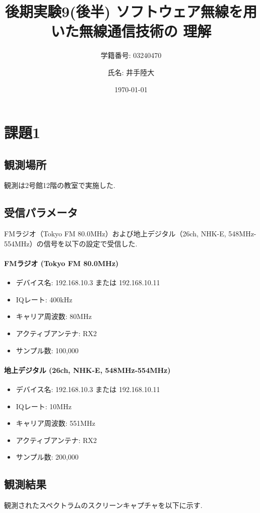 \documentclass[a4paper, twocolumn]{article} %
\title{後期実験9(後半) ソフトウェア無線を用いた無線通信技術の
理解}
\author{学籍番号: 03240470 \and 氏名: 井手陸大}
\date{\today}
\begin{document}
\maketitle

\section{課題1}
\subsection{観測場所}
観測は2号館12階の教室で実施した.

\subsection{受信パラメータ}
FMラジオ（Tokyo FM 80.0MHz）および地上デジタル（26ch, NHK-E, 548MHz-554MHz）の信号を以下の設定で受信した.

\paragraph{FMラジオ (Tokyo FM 80.0MHz)}
\begin{itemize}
    \item デバイス名: 192.168.10.3 または 192.168.10.11
    \item IQレート: 400kHz
    \item キャリア周波数: 80MHz
    \item アクティブアンテナ: RX2
    \item サンプル数: 100,000
\end{itemize}

\paragraph{地上デジタル (26ch, NHK-E, 548MHz-554MHz)}
\begin{itemize}
    \item デバイス名: 192.168.10.3 または 192.168.10.11
    \item IQレート: 10MHz
    \item キャリア周波数: 551MHz
    \item アクティブアンテナ: RX2
    \item サンプル数: 200,000
\end{itemize}

\subsection{観測結果}
観測されたスペクトラムのスクリーンキャプチャを以下に示す.
\end{document}
